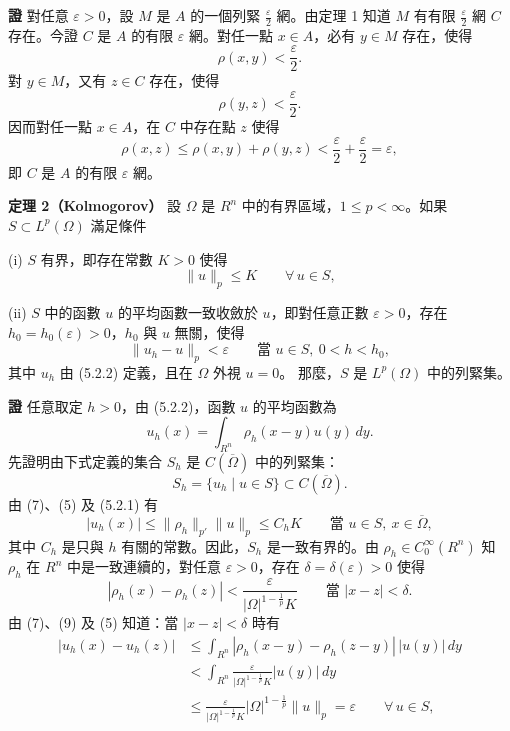 \documentclass[11pt,a4paper,twoside]{article}
\begin{document}
\noindent\textbf{證}\quad
對任意 $\varepsilon>0$，設 $M$ 是 $A$ 的一個列緊
$\frac{\varepsilon}{2}$ 網。由定理 1 知道 $M$ 有有限
$\frac{\varepsilon}{2}$ 網 $C$ 存在。今證 $C$ 是 $A$ 的有限
$\varepsilon$ 網。對任一點 $x\in A$，必有 $y\in M$ 存在，使得
\[
    \rho(x,y)<\frac{\varepsilon}{2}.
\]
對 $y\in M$，又有 $z\in C$ 存在，使得
\[
    \rho(y,z)<\frac{\varepsilon}{2}.
\]
因而對任一點 $x\in A$，在 $C$ 中存在點 $z$ 使得
\[
    \rho(x,z)\le\rho(x,y)+\rho(y,z)
    <
    \frac{\varepsilon}{2}+\frac{\varepsilon}{2}
    =
    \varepsilon,
\]
即 $C$ 是 $A$ 的有限 $\varepsilon$ 網。

\newpage

\noindent\textbf{定理 2（Kolmogorov）}\quad
設 $\Omega$ 是 $R^n$ 中的有界區域，$1\le p<\infty$。如果
$S\subset L^p(\Omega)$ 滿足條件

\noindent
(i) $S$ 有界，即存在常數 $K>0$ 使得
\[
    \|u\|_p\le K
    \qquad
    \forall\,u\in S,
    \tag{5}
\]

\noindent
(ii) $S$ 中的函數 $u$ 的平均函數一致收斂於 $u$，即對任意正數
$\varepsilon>0$，存在 $h_0=h_0(\varepsilon)>0$，$h_0$ 與 $u$ 無關，使得
\[
    \|u_h-u\|_p<\varepsilon
    \qquad
    \text{當 }u\in S,\ 0<h<h_0,
    \tag{6}
\]
其中 $u_h$ 由 (5.2.2) 定義，且在 $\Omega$ 外視 $u=0$。
那麼，$S$ 是 $L^p(\Omega)$ 中的列緊集。

\noindent\textbf{證}\quad
任意取定 $h>0$，由 (5.2.2)，函數 $u$ 的平均函數為
\[
    u_h(x)=\int_{R^n}\rho_h(x-y)u(y)\,dy.
    \tag{7}
\]
先證明由下式定義的集合 $S_h$ 是 $C(\overline{\Omega})$ 中的列緊集：
\[
    S_h=\{u_h\mid u\in S\}\subset C(\overline{\Omega}).
    \tag{8}
\]
由 (7)、(5) 及 (5.2.1) 有
\[
    |u_h(x)|
    \le
    \|\rho_h\|_{p'}\|u\|_p
    \le
    C_hK
    \qquad
    \text{當 }u\in S,\ x\in\overline{\Omega},
\]
其中 $C_h$ 是只與 $h$ 有關的常數。因此，$S_h$ 是一致有界的。由
$\rho_h\in C_0^\infty(R^n)$ 知 $\rho_h$ 在 $R^n$ 中是一致連續的，對任意
$\varepsilon>0$，存在 $\delta=\delta(\varepsilon)>0$ 使得
\[
    |\rho_h(x)-\rho_h(z)|
    <
    \frac{\varepsilon}
    {|\Omega|^{1-\frac1p}K}
    \qquad
    \text{當 }|x-z|<\delta.
    \tag{9}
\]
由 (7)、(9) 及 (5) 知道：當 $|x-z|<\delta$ 時有
\[
    \begin{aligned}
        |u_h(x)-u_h(z)|
         & \le
        \int_{R^n}
        |\rho_h(x-y)-\rho_h(z-y)|\,|u(y)|\,dy \\
         & <
        \int_{R^n}
        \frac{\varepsilon}
        {|\Omega|^{1-\frac1p}K}|u(y)|\,dy     \\
         & \le
        \frac{\varepsilon}
        {|\Omega|^{1-\frac1p}K}
        |\Omega|^{1-\frac1p}\|u\|_p
        =
        \varepsilon
        \qquad \forall\,u\in S,
    \end{aligned}
\]
\end{document}
